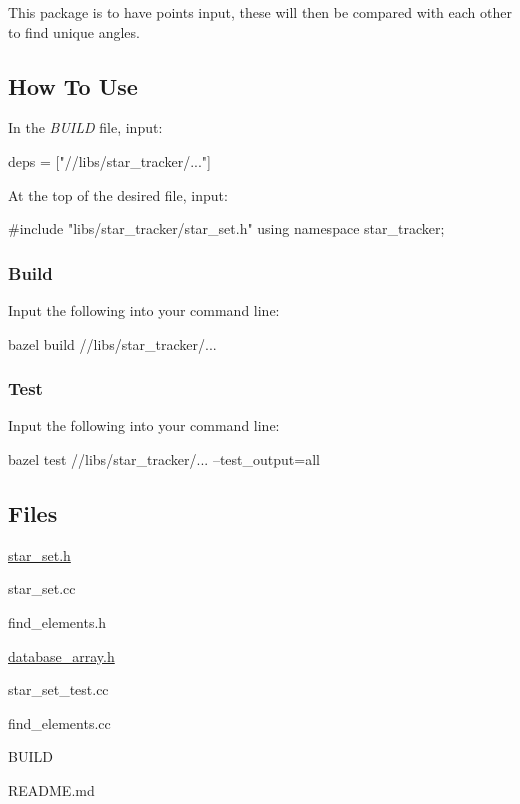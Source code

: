 This package is to have points input, these will then be compared with each other to find unique angles.

\subsection*{How To Use}

In the {\itshape B\+U\+I\+LD} file, input\+: 
\begin{DoxyCode}
deps = ["//libs/star\_tracker/..."]
\end{DoxyCode}
 At the top of the desired file, input\+: 
\begin{DoxyCode}
#include "libs/star\_tracker/star\_set.h"
using namespace star\_tracker;
\end{DoxyCode}


\subsubsection*{Build}

Input the following into your command line\+: 
\begin{DoxyCode}
bazel build //libs/star\_tracker/...
\end{DoxyCode}


\subsubsection*{Test}

Input the following into your command line\+: 
\begin{DoxyCode}
bazel test //libs/star\_tracker/... --test\_output=all
\end{DoxyCode}


\subsection*{Files}


\begin{DoxyItemize}
\item \hyperlink{star__set_8h_source}{star\+\_\+set.\+h}
\item star\+\_\+set.\+cc
\item find\+\_\+elements.\+h
\item \hyperlink{database__array_8h}{database\+\_\+array.\+h} ~\newline
~\newline

\item star\+\_\+set\+\_\+test.\+cc
\item find\+\_\+elements.\+cc ~\newline
~\newline

\item B\+U\+I\+LD
\item R\+E\+A\+D\+M\+E.\+md
\end{DoxyItemize}

